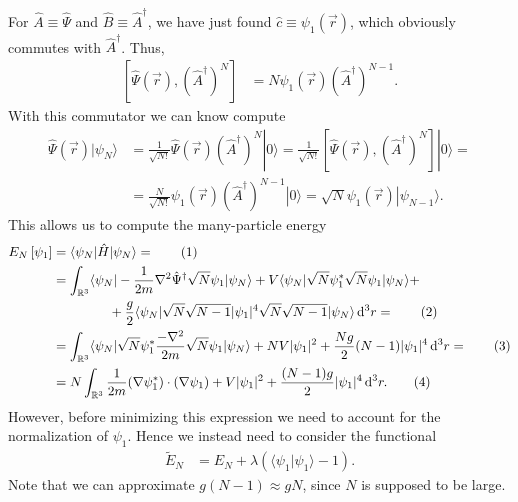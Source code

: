 \documentclass[english, parskip=full]{scrartcl}
\newcommand\numberthis{\addtocounter{equation}{1}\tag{\theequation}}
\newcommand{\brak}{}
\newcommand{\braket}{}
\newcommand{\intr}{}
\newcommand{\kla}{}
\newcommand{\klam}{}
\newcommand{\Ket}{}
\begin{document}
For $\hat{A} \equiv \hat{\Psi}$ and $\hat{B} \equiv \hat{A}^\dagger$, we have just found $\hat{c} \equiv \psi_1(\vec{r})$, which obviously commutes with $\hat{A}^\dagger$.
Thus, 
\begin{align}
\klam\left[ \hat{\Psi}(\vec{r}), \kla\left( \hat{A}^\dagger \right)^N \right] &= N\psi_1(\vec{r}) \kla\left( \hat{A}^\dagger \right)^{N-1}.
\end{align}
With this commutator we can know compute
\begin{align}
\hat{\Psi}(\vec{r}) \Ket | \psi_N \rangle &= \frac{1}{\sqrt{N!}} \hat{\Psi} (\vec{r}) \kla\left( \hat{A}^\dagger \right)^N \Ket | 0 \rangle = \frac{1}{\sqrt{N!}} \klam\left[ \hat{\Psi} (\vec{r}), \kla\left( \hat{A}^\dagger \right)^N \right] \Ket | 0  \rangle = \\
&= \frac{N}{\sqrt{N!}} \psi_1(\vec{r}) \kla\left( \hat{A}^\dagger \right)^{N-1} \Ket | 0 \rangle = \sqrt{N} \psi_1(\vec{r}) \Ket | \psi_{N-1} \rangle.
\end{align}
This allows us to compute the many-particle energy
\begin{align*}
E_N\klam\left[ \psi_1 \right] &= \braket\langle \psi_N | \hat{H} | \psi_N \rangle = \numberthis \\
&= \intr\int_{\mathbb{R}^{3}} \braket\langle \psi_N | -\frac{1}{2m}\nabla^2\hat{\Psi}^\dagger \sqrt{N}\psi_1 | \psi_N \rangle + V\braket\langle \psi_N | \sqrt{N}\psi_1^\ast \sqrt{N}\psi_1 | \psi_N \rangle + \\
&\hspace{1.5cm} + \frac{g}{2}\braket\langle \psi_N | \sqrt{N}\sqrt{N-1} |\psi_1|^4 \sqrt{N}\sqrt{N-1} | \psi_N \rangle \, \mathrm{d}^{3}r = \numberthis \\
&= \intr\int_{\mathbb{R}^{3}} \braket\langle \psi_N | \sqrt{N}\psi_1^\ast \frac{-\nabla^2}{2m} \sqrt{N}\psi_1 | \psi_N \rangle + NV|\psi_1|^2 + \frac{Ng}{2}(N-1) |\psi_1|^4 \, \mathrm{d}^{3}r = \numberthis \\
&= N\intr\int_{\mathbb{R}^{3}} \frac{1}{2m}(\nabla\psi_1^\ast)\cdot (\nabla\psi_1) + V|\psi_1|^2 + \frac{(N-1)g}{2} |\psi_1|^4 \, \mathrm{d}^{3}r. \numberthis
\end{align*}
However, before minimizing this expression we need to account for the normalization of $\psi_1$. 
Hence we instead need to consider the functional
\begin{align}
\tilde{E}_N &= E_N + \lambda \kla\left( \brak\langle \psi_1 | \psi_1 \rangle - 1 \right).
\end{align}
Note that we can approximate $g(N-1)\approx gN$, since $N$ is supposed to be large.
\end{document}
